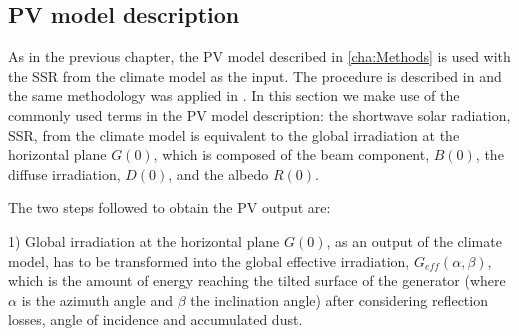  
\subsection{PV model description}

As in the previous chapter, the PV model described in \ref{cha:Methods} is used with the SSR from the climate model as the input. The procedure is described in \cite{Perpinan2009} and the same methodology was applied in \cite{Gutierrez2017}. In this section we make use of the commonly used terms in the PV model description: the shortwave solar radiation, SSR, from the climate model is equivalent to the global irradiation at the horizontal plane $G(0)$, which is composed of the beam component, $B(0)$, the diffuse irradiation, $D(0)$, and the albedo $R(0)$.


The two steps followed to obtain the PV output are:

1) Global irradiation at the horizontal plane $G(0)$, as an output of the climate model, has to be transformed into the global effective irradiation, $G_{eff}(\alpha, \beta)$, which is the amount of energy reaching the tilted surface of the generator (where $\alpha$ is the azimuth angle and $\beta$ the inclination angle) after considering reflection losses, angle of incidence and accumulated dust.  


